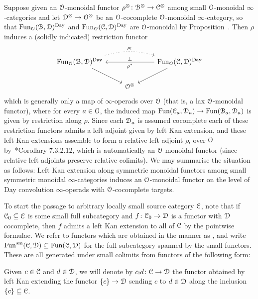 \begin{remark}
\label{remark:left-kan-monoidal}%
Suppose given an $\mathcal{O}$-monoidal functor $\rho^{\otimes}\colon \mathcal{B}^{\otimes} \to \mathcal C^{\otimes}$ among small $\mathcal{O}$-monoidal $\infty$-categories and let $\mathcal{D}^{\otimes} \to \mathcal{O}^{\otimes}$ be an $\mathcal{O}$-cocomplete $\mathcal{O}$-monoidal $\infty$-category, so that $\operatorname{Fun}_{\mathcal{O}}(\mathcal{B},\mathcal{D})^{\mathrm{Day}}$ and $\operatorname{Fun}_{\mathcal{O}}(\mathcal C,\mathcal{D})^{\mathrm{Day}}$ are $\mathcal{O}$-monoidal by Proposition~. Then $\rho$ induces a (solidly indicated) restriction functor 
\[
\begin{tikzcd}
\Fun_{\cO}(\cB,\D)^{\Day} \ar[rr,bend left =15,dotted,"\rho_!"]\ar[dr]&& \ar[ll,"\rho^*","\perp"'] \Fun_{\cO}(\C,\D)^{\Day}\ar[dl] \\
& \cO^{\otimes} &
\end{tikzcd}
\]
which is generally only a map of $\infty$-operads over $\mathcal{O}$ (that is, a lax $\mathcal{O}$-monoidal functor), where for every $a \in \mathcal{O}$, the induced map $\operatorname{Fun}(\mathcal C_a,\mathcal{D}_a) \to \operatorname{Fun}(\mathcal{B}_a,\mathcal{D}_a)$ is given by restriction along $\rho$. Since each $\mathcal{D}_a$ is assumed cocomplete each of these restriction functors admits a left adjoint given by left Kan extension,  
and these left Kan extensions assemble to form a relative left adjoint $\rho_!$ over $\mathcal{O}$ by~\cite{HA}*{Corollary 7.3.2.12}, which is automatically %
an $\mathcal{O}$-monoidal functor (since relative left adjoints preserve relative colimits). 
We may summarise the situation as follows: Left Kan extension along symmetric monoidal functors among small symmetric monoidal $\infty$-categories induces an $\mathcal{O}$-monoidal functor on the level of Day convolution $\infty$-operads
with $\mathcal{O}$-cocomplete targets. 
\end{remark}






To start the passage to arbitrary locally small
source category $\mathcal C$, note that if $\mathcal C_0 \subseteq \mathcal C$ is some small full subcategory and $f\colon \mathcal C_0 \to \mathcal{D}$ is a functor with $\mathcal{D}$ cocomplete, then $f$ admits a left Kan extension to all of $\mathcal C$ by the pointwise formulae. We refer to functors which are obtained in the manner as , and write $\operatorname{Fun}^{\mathrm{sm}}(\mathcal C,\mathcal{D}) \subseteq \operatorname{Fun}(\mathcal C,\mathcal{D})$ for the full subcategory spanned by the small functors. These are all generated under small colimits from functors of the following form:

\begin{notation}
\label{notation:representable}%
Given $c \in \mathcal C$ and $d \in \mathcal{D}$, we will denote by $c_!d \colon \mathcal C \to \mathcal{D}$ the functor obtained by left Kan extending the functor $\{c\} \to \mathcal{D}$ sending $c$ to $d \in \mathcal{D}$ along the inclusion $\{c\} \subseteq \mathcal C$. 
\end{notation}


